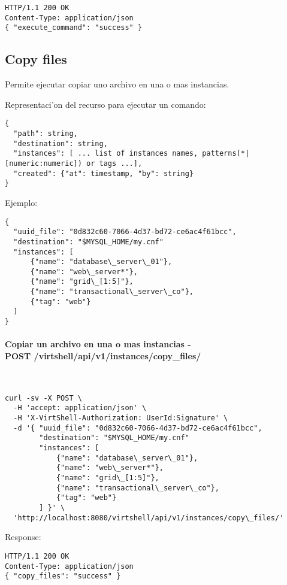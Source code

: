 \begin{lstlisting}[style=json]
HTTP/1.1 200 OK
Content-Type: application/json
{ "execute_command": "success" }
\end{lstlisting}


\subsection{Copy files}

Permite ejecutar copiar uno archivo en una o mas instancias.

Representaci'on del recurso para ejecutar un comando:

\medskip
\begin{lstlisting}[style=json]
{
  "path": string,
  "destination": string,
  "instances": [ ... list of instances names, patterns(*|[numeric:numeric]) or tags ...],
  "created": {"at": timestamp, "by": string}
}
\end{lstlisting}

Ejemplo:

\medskip
\begin{lstlisting}[style=json]
{
  "uuid_file": "0d832c60-7066-4d37-bd72-ce6ac4f61bcc",
  "destination": "$MYSQL_HOME/my.cnf"
  "instances": [
      {"name": "database\_server\_01"},
      {"name": "web\_server*"},
      {"name": "grid\_[1:5]"},
      {"name": "transactional\_server\_co"},
      {"tag": "web"}
  ]
}
\end{lstlisting}

\paragraph{Copiar un archivo en una o mas instancias - \\ POST /virtshell/api/v1/instances/copy\_files/} ~\\

\begin{lstlisting}[style=json]
curl -sv -X POST \
  -H 'accept: application/json' \
  -H 'X-VirtShell-Authorization: UserId:Signature' \
  -d '{ "uuid_file": "0d832c60-7066-4d37-bd72-ce6ac4f61bcc",
        "destination": "$MYSQL_HOME/my.cnf"
        "instances": [
            {"name": "database\_server\_01"},
            {"name": "web\_server*"},
            {"name": "grid\_[1:5]"},
            {"name": "transactional\_server\_co"},
            {"tag": "web"}
        ] }' \
  'http://localhost:8080/virtshell/api/v1/instances/copy\_files/'
\end{lstlisting}

Response:

\begin{lstlisting}[style=json]
HTTP/1.1 200 OK
Content-Type: application/json
{ "copy_files": "success" }
\end{lstlisting}
